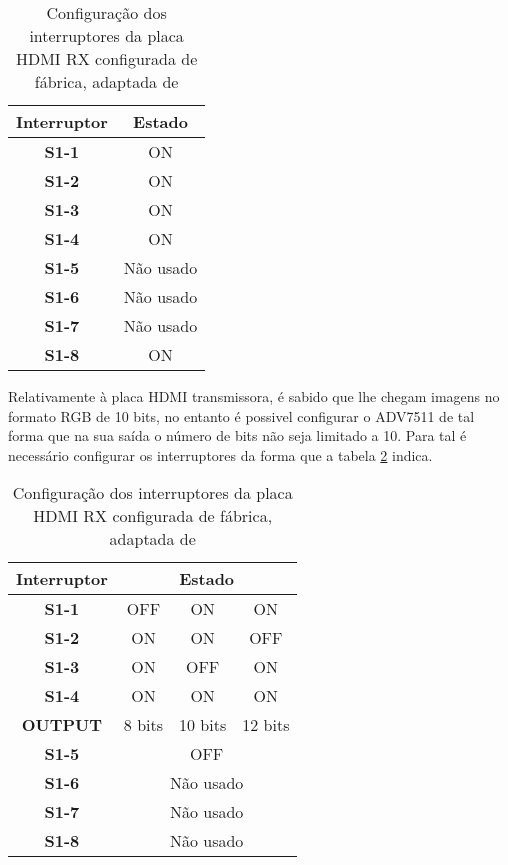 \begin{table}[h!]
	\centering
	\begin{tabular}{|c|c|}
		\hline
		\textbf{Interruptor} & \textbf{Estado} \\ \hline
		\textbf{S1-1}        & ON              \\ \hline
		\textbf{S1-2}        & ON              \\ \hline
		\textbf{S1-3}        & ON              \\ \hline
		\textbf{S1-4}        & ON              \\ \hline
		\textbf{S1-5}        & Não usado       \\ \hline
		\textbf{S1-6}        & Não usado       \\ \hline
		\textbf{S1-7}        & Não usado       \\ \hline
		\textbf{S1-8}        & ON              \\ \hline
	\end{tabular}
	\caption{Configuração dos interruptores da placa HDMI RX configurada de fábrica, adaptada de \cite{R009}}
	\label{table:HDMI_default_switches_RX}
\end{table}

Relativamente à placa HDMI transmissora, é sabido que lhe chegam imagens no formato RGB de 10 bits, no entanto é possivel configurar o ADV7511 de tal forma que na sua saída o número de bits não seja limitado a 10. Para tal é necessário configurar os interruptores da forma que a tabela \ref{table:HDMI_default_switches_TX} indica.

 \begin{table}[h!]
	\centering
	\begin{tabular}{|c|c|c|c|}
		\hline
		\textbf{Interruptor} & \multicolumn{3}{c|}{\textbf{Estado}} \\ \hline
		\textbf{S1-1}        & OFF        & ON         & ON         \\ \hline
		\textbf{S1-2}        & ON         & ON         & OFF        \\ \hline
		\textbf{S1-3}        & ON         & OFF        & ON        \\ \hline
		\textbf{S1-4}        & ON         & ON         & ON         \\ \hline
		\textbf{OUTPUT}      & 8 bits     & 10 bits    & 12 bits    \\ \hline
		\textbf{S1-5}        & \multicolumn{3}{c|}{OFF}             \\ \hline
		\textbf{S1-6}        & \multicolumn{3}{c|}{Não usado}       \\ \hline
		\textbf{S1-7}        & \multicolumn{3}{c|}{Não usado}       \\ \hline
		\textbf{S1-8}        & \multicolumn{3}{c|}{Não usado}       \\ \hline
	\end{tabular}
	\caption{Configuração dos interruptores da placa HDMI RX configurada de fábrica, adaptada de \cite{R009}}
	\label{table:HDMI_default_switches_TX}
\end{table}

